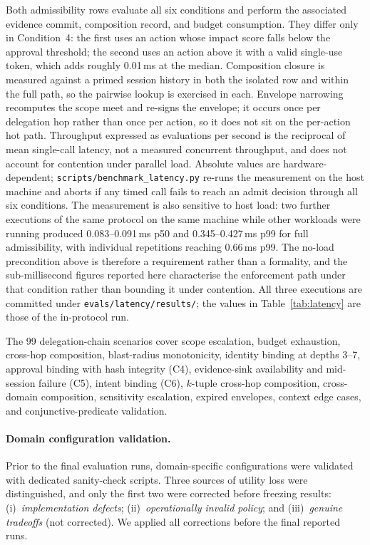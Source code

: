 \documentclass[sigconf,nonacm]{acmart}
\begin{document}
\noindent Both admissibility rows evaluate all six conditions and perform the associated evidence commit, composition record, and budget consumption. They differ only in Condition~4: the first uses an action whose impact score falls below the approval threshold; the second uses an action above it with a valid single-use token, which adds roughly 0.01\,ms at the median. Composition closure is measured against a primed session history in both the isolated row and within the full path, so the pairwise lookup is exercised in each. Envelope narrowing recomputes the scope meet and re-signs the envelope; it occurs once per delegation hop rather than once per action, so it does not sit on the per-action hot path. Throughput expressed as evaluations per second is the reciprocal of mean single-call latency, not a measured concurrent throughput, and does not account for contention under parallel load. Absolute values are hardware-dependent; \texttt{scripts/benchmark\_latency.py} re-runs the measurement on the host machine and aborts if any timed call fails to reach an admit decision through all six conditions. The measurement is also sensitive to host load: two further executions of the same protocol on the same machine while other workloads were running produced 0.083--0.091\,ms p50 and 0.345--0.427\,ms p99 for full admissibility, with individual repetitions reaching 0.66\,ms p99. The no-load precondition above is therefore a requirement rather than a formality, and the sub-millisecond figures reported here characterise the enforcement path under that condition rather than bounding it under contention. All three executions are committed under \texttt{evals/latency/results/}; the values in Table~\ref{tab:latency} are those of the in-protocol run.

The 99 delegation-chain scenarios cover scope escalation, budget exhaustion, cross-hop composition, blast-radius monotonicity, identity binding at depths 3--7, approval binding with hash integrity (C4), evidence-sink availability and mid-session failure (C5), intent binding (C6), $k$-tuple cross-hop composition, cross-domain composition, sensitivity escalation, expired envelopes, context edge cases, and conjunctive-predicate validation.

\paragraph{Domain configuration validation.} Prior to the final evaluation runs, domain-specific configurations were validated with dedicated sanity-check scripts. Three sources of utility loss were distinguished, and only the first two were corrected before freezing results: (i)~\emph{implementation defects}; (ii)~\emph{operationally invalid policy}; and (iii)~\emph{genuine tradeoffs} (not corrected). We applied all corrections before the final reported runs.
\end{document}
